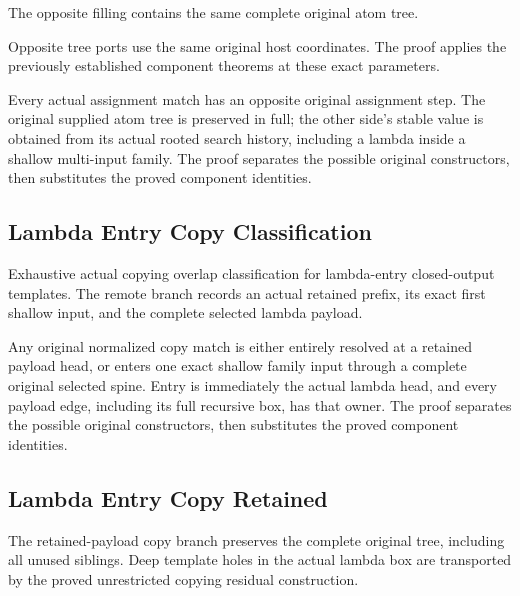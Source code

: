 The opposite filling contains the same complete original atom tree.
\par{}

Opposite tree ports use the same original host coordinates.
The proof applies the previously established component theorems at these exact parameters.
\par{}

Every actual assignment match has an opposite original assignment step.
The original supplied atom tree is preserved in full; the other side's stable
value is obtained from its actual rooted search history, including a lambda
inside a shallow multi-input family.
The proof separates the possible original constructors, then substitutes the proved component identities.
\par{}

\subsection{Lambda Entry Copy Classification}
Exhaustive actual copying overlap classification for lambda-entry
closed-output templates. The remote branch records an actual retained prefix,
its exact first shallow input, and the complete selected lambda payload.

Any original normalized copy match is either entirely resolved at a
retained payload head, or enters one exact shallow family input through a
complete original selected spine. Entry is immediately the actual lambda
head, and every payload edge, including its full recursive box, has that owner.
The proof separates the possible original constructors, then substitutes the proved component identities.
\par{}

\subsection{Lambda Entry Copy Retained}
The retained-payload copy branch preserves the complete original tree,
including all unused siblings. Deep template holes in the actual lambda box
are transported by the proved unrestricted copying residual construction.


